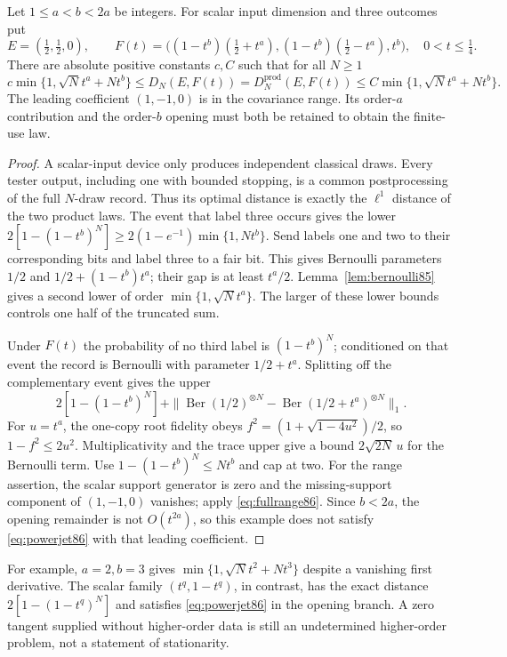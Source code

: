 \begin{proposition}\label{prop:mixedrates86}
Let $1\le a<b<2a$ be integers.  For scalar input dimension and three
outcomes put
\[
 E=(\tfrac12,\tfrac12,0),\qquad
 F(t)=\bigl((1-t^b)(\tfrac12+t^a),
            (1-t^b)(\tfrac12-t^a),t^b\bigr),
 \quad 0<t\le\tfrac14.
\]
There are absolute positive constants $c,C$ such that for all $N\ge1$
\begin{equation}\label{eq:mixedrates86}
 c\min\{1,\sqrt N t^a+Nt^b\}
 \le D_N(E,F(t))=D_N^{\mathrm{prod}}(E,F(t))
 \le C\min\{1,\sqrt N t^a+Nt^b\}.
\end{equation}
The leading coefficient $(1,-1,0)$ is in the covariance range.
Its order-$a$ contribution and the order-$b$ opening must both be
retained to obtain the finite-use law.
\end{proposition}
\begin{proof}
A scalar-input device only produces independent classical draws.
Every tester output, including one with bounded stopping, is a common
postprocessing of the full $N$-draw record.  Thus its optimal distance
is exactly the $\ell^1$ distance of the two product laws.
The event that label three occurs gives the lower
$2[1-(1-t^b)^N]\ge2(1-e^{-1})\min\{1,Nt^b\}$.
Send labels one and two to their corresponding bits and label three
to a fair bit.  This gives Bernoulli parameters $1/2$ and
$1/2+(1-t^b)t^a$; their gap is at least $t^a/2$.
Lemma~\ref{lem:bernoulli85} gives a second lower of order
$\min\{1,\sqrt N t^a\}$.  The larger of these lower bounds controls
one half of the truncated sum.

Under $F(t)$ the probability of no third label is $(1-t^b)^N$;
conditioned on that event the record is Bernoulli with parameter
$1/2+t^a$.  Splitting off the complementary event gives the upper
\[
 2[1-(1-t^b)^N]
 +\|\operatorname{Ber}(1/2)^{\otimes N}
       -\operatorname{Ber}(1/2+t^a)^{\otimes N}\|_1.
\]
For $u=t^a$, the one-copy root fidelity obeys
$f^2=(1+\sqrt{1-4u^2})/2$, so $1-f^2\le2u^2$.
Multiplicativity and the trace upper give a bound $2\sqrt{2N}\,u$
for the Bernoulli term.  Use $1-(1-t^b)^N\le Nt^b$ and cap at two.
For the range assertion, the scalar support generator is zero and
the missing-support component of $(1,-1,0)$ vanishes; apply
\eqref{eq:fullrange86}.  Since $b<2a$, the opening remainder is not
$O(t^{2a})$, so this example does not satisfy
\eqref{eq:powerjet86} with that leading coefficient.
\end{proof}

For example, $a=2,b=3$ gives
$\min\{1,\sqrt N t^2+Nt^3\}$ despite a vanishing first derivative.
The scalar family $(t^q,1-t^q)$, in contrast, has the exact distance
$2[1-(1-t^q)^N]$ and satisfies \eqref{eq:powerjet86} in the opening
branch.  A zero tangent supplied without higher-order data is still
an undetermined higher-order problem, not a statement of stationarity.

